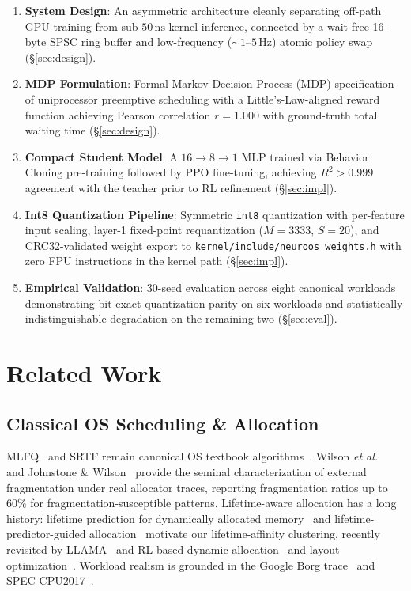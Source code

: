 \begin{enumerate}
  \item \textbf{System Design}: An asymmetric architecture cleanly separating
    off-path GPU training from sub-$50\,\text{ns}$ kernel inference, connected
    by a wait-free 16-byte SPSC ring buffer and low-frequency ($\sim 1\text{--}5\,\text{Hz}$)
    atomic policy swap (\S\ref{sec:design}).

  \item \textbf{MDP Formulation}: Formal Markov Decision Process (MDP)
    specification of uniprocessor preemptive scheduling with a
    Little's-Law-aligned reward function achieving Pearson correlation
    $r = 1.000$ with ground-truth total waiting time (\S\ref{sec:design}).

  \item \textbf{Compact Student Model}: A $16\to 8\to 1$ MLP trained via
    Behavior Cloning pre-training followed by PPO fine-tuning, achieving
    $R^2 > 0.999$ agreement with the teacher prior to RL refinement
    (\S\ref{sec:impl}).

  \item \textbf{Int8 Quantization Pipeline}: Symmetric \texttt{int8}
    quantization with per-feature input scaling, layer-1 fixed-point
    requantization ($M = 3333,\,S = 20$), and CRC32-validated weight export to
    \texttt{kernel/include/neuroos\_weights.h} with zero FPU instructions in
    the kernel path (\S\ref{sec:impl}).

  \item \textbf{Empirical Validation}: 30-seed evaluation across eight canonical
    workloads demonstrating bit-exact quantization parity on six workloads and
    statistically indistinguishable degradation on the remaining two
    (\S\ref{sec:eval}).
\end{enumerate}

\section{Related Work}
\label{sec:related}

\subsection{Classical OS Scheduling \& Allocation}

MLFQ~\cite{Corbato1962} and SRTF remain canonical OS textbook algorithms~\cite{Arpaci2018}.
Wilson \textit{et al.}~\cite{Wilson1995} and Johnstone \&
Wilson~\cite{Johnstone1998} provide the seminal characterization of external
fragmentation under real allocator traces, reporting fragmentation ratios up to
$60\%$ for fragmentation-susceptible patterns. Lifetime-aware allocation has
a long history: lifetime prediction for dynamically allocated
memory~\cite{LifetimeNeurIPS1995} and lifetime-predictor-guided
allocation~\cite{LifetimePredictors1993} motivate our lifetime-affinity
clustering, recently revisited by LLAMA~\cite{LLAMA2024} and RL-based dynamic
allocation~\cite{RLMemAlloc2021} and layout optimization~\cite{AIMO2023}.
Workload realism is grounded in the Google Borg
trace~\cite{Borg2020} and SPEC CPU2017~\cite{SPEC2017,SPECChar2021}.

